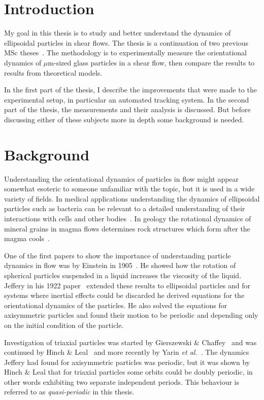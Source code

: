 \section{Introduction}
My goal in this thesis is to study and better understand the dynamics of ellipsoidal particles in shear flows. The thesis is a continuation of two previous MSc theses~\cite{AntonThesis, JonasThesis}. The methodology is to experimentally measure the orientational dynamics of $\mu$m-sized glass particles in a shear flow, then compare the results to results from theoretical models. 

In the first part of the thesis, I describe the improvements that were made to the experimental setup, in particular an automated tracking system. In the second part of the thesis, the measurements and their analysis is discussed. But before discussing either of these subjects more in depth some background is needed.

\section{Background}
Understanding the orientational dynamics of particles in flow might appear somewhat esoteric to someone unfamiliar with the topic, but it is used in a wide variety of fields. In medical applications understanding the dynamics of ellipsoidal particles such as bacteria can be relevant to a detailed understanding of their interactions with cells and other bodies~\cite{Tolga}. In geology the rotational dynamics of mineral grains in magma flows determines rock structures which form after the magma cools~\cite{geology}.

One of the first papers to show the importance of understanding particle dynamics in flow was by Einstein in 1905~\cite{Einstein}. He showed how the rotation of spherical particles suspended in a liquid increases the viscosity of the liquid. Jeffery in his 1922 paper~\cite{Jeffery} extended these results to ellipsoidal  particles and for systems where inertial effects could be discarded he derived equations for the orientational dynamics of the particles. He also solved the equations for axisymmetric particles and found their motion to be periodic and depending only on the initial condition of the particle. 

Investigation of triaxial particles was started by Gierszewski \& Chaffey~\cite{Chaffey} and was continued by Hinch \& Leal~\cite{Leal} and more recently by Yarin \emph{et al.}~\cite{Yarin}. 
The dynamics Jeffery had found for axisymmetric particles was periodic, but it was shown by Hinch \& Leal that for triaxial particles some orbits could be doubly periodic, in other words exhibiting two separate independent periods. This behaviour is referred to as \emph{quasi-periodic} in this thesis.

